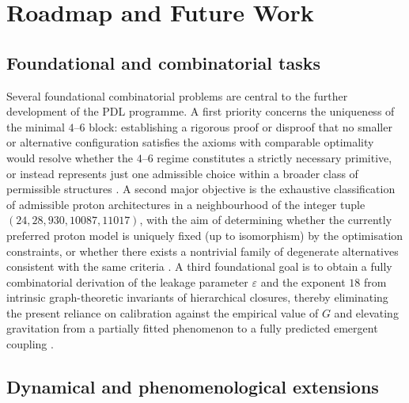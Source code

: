 \documentclass{article}
\begin{document}
\section{Roadmap and Future Work}
\label{sec:roadmap}

\subsection{Foundational and combinatorial tasks}
\label{subsec:roadmap_foundational}

Several foundational combinatorial problems are central to the further development of the PDL programme. A first priority concerns the uniqueness of the minimal $4$–$6$ block: establishing a rigorous proof or disproof that no smaller or alternative configuration satisfies the axioms with comparable optimality would resolve whether the $4$–$6$ regime constitutes a strictly necessary primitive, or instead represents just one admissible choice within a broader class of permissible structures \citep{PDL_Main_2026,PDL_position}. A second major objective is the exhaustive classification of admissible proton architectures in a neighbourhood of the integer tuple $(24,28,930,10087,11017)$, with the aim of determining whether the currently preferred proton model is uniquely fixed (up to isomorphism) by the optimisation constraints, or whether there exists a nontrivial family of degenerate alternatives consistent with the same criteria \citep{Combinatorial_Proton_v2_2026,PDL_position}. A third foundational goal is to obtain a fully combinatorial derivation of the leakage parameter $\varepsilon$ and the exponent $18$ from intrinsic graph-theoretic invariants of hierarchical closures, thereby eliminating the present reliance on calibration against the empirical value of $G$ and elevating gravitation from a partially fitted phenomenon to a fully predicted emergent coupling \citep{Exponent_18_PDL_2026,Coherence_Leakage_18_2026,PDL_position}.

\subsection{Dynamical and phenomenological extensions}
\label{subsec:roadmap_dynamical}
\end{document}
